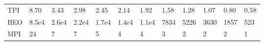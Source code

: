 \begin{table*}
{\begin{tabular}{llllllllllll}
TPI      &             8.70 &               3.43 &               2.98 &               2.45 &             2.14 &             1.92 &             1.58 &             1.28 &             1.07 &            0.80 &             0.58 \\
HEO      &            8.5e4 &              2.6e4 &              2.2e4 &              1.7e4 &            1.4e4 &            1.1e4 &             7834 &             5226 &             3630 &            1857 &              523 \\
MPI      &               24 &                  7 &                  7 &                  5 &                4 &                4 &                3 &                2 &                2 &               2 &                1 \\
\bottomrule
\end{tabular}}
\end{table*}



